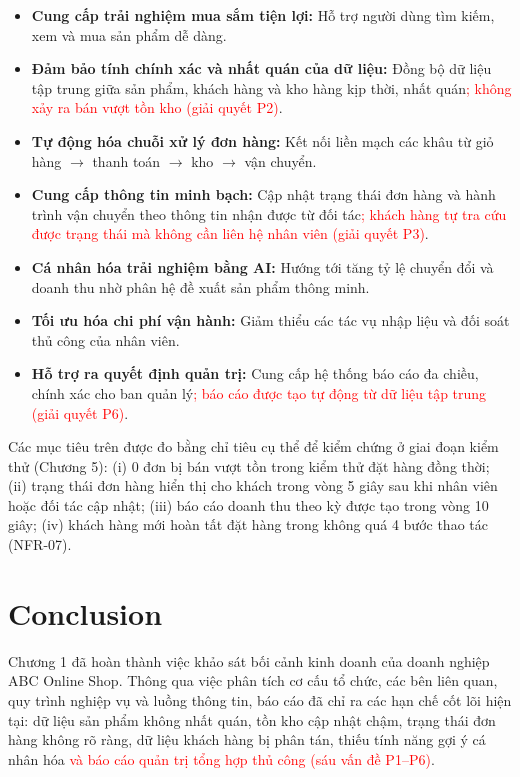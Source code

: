 \documentclass[12pt,a4paper,oneside]{report}
\newif\ifmark \marktrue
\newcommand{\chg}[1]{\ifmark\textcolor{red}{#1}\else #1\fi}
\newenvironment{chgblock}{\ifmark\color{red}\fi}{}
\begin{document}
\begin{itemize}
  \item \textbf{Cung cấp trải nghiệm mua sắm tiện lợi:} Hỗ trợ người dùng tìm kiếm, xem và mua sản phẩm dễ dàng.
  \item \textbf{Đảm bảo tính chính xác và nhất quán của dữ liệu:} Đồng bộ dữ liệu tập trung giữa sản phẩm, khách hàng và kho hàng kịp thời, nhất quán\chg{; không xảy ra bán vượt tồn kho (giải quyết P2)}.
  \item \textbf{Tự động hóa chuỗi xử lý đơn hàng:} Kết nối liền mạch các khâu từ giỏ hàng $\rightarrow$ thanh toán $\rightarrow$ kho $\rightarrow$ vận chuyển.
  \item \textbf{Cung cấp thông tin minh bạch:} Cập nhật trạng thái đơn hàng và hành trình vận chuyển theo thông tin nhận được từ đối tác\chg{; khách hàng tự tra cứu được trạng thái mà không cần liên hệ nhân viên (giải quyết P3)}.
  \item \textbf{Cá nhân hóa trải nghiệm bằng AI:} Hướng tới tăng tỷ lệ chuyển đổi và doanh thu nhờ phân hệ đề xuất sản phẩm thông minh.
  \item \textbf{Tối ưu hóa chi phí vận hành:} Giảm thiểu các tác vụ nhập liệu và đối soát thủ công của nhân viên.
  \item \textbf{Hỗ trợ ra quyết định quản trị:} Cung cấp hệ thống báo cáo đa chiều, chính xác cho ban quản lý\chg{; báo cáo được tạo tự động từ dữ liệu tập trung (giải quyết P6)}.
\end{itemize}

\begin{chgblock}
Các mục tiêu trên được đo bằng chỉ tiêu cụ thể để kiểm chứng ở giai đoạn kiểm thử (Chương 5): (i) 0 đơn bị bán vượt tồn trong kiểm thử đặt hàng đồng thời; (ii) trạng thái đơn hàng hiển thị cho khách trong vòng 5 giây sau khi nhân viên hoặc đối tác cập nhật; (iii) báo cáo doanh thu theo kỳ được tạo trong vòng 10 giây; (iv) khách hàng mới hoàn tất đặt hàng trong không quá 4 bước thao tác (NFR-07).
\end{chgblock}

\section{Conclusion}

Chương 1 đã hoàn thành việc khảo sát bối cảnh kinh doanh của doanh nghiệp ABC Online Shop. Thông qua việc phân tích cơ cấu tổ chức, các bên liên quan, quy trình nghiệp vụ và luồng thông tin, báo cáo đã chỉ ra các hạn chế cốt lõi hiện tại: dữ liệu sản phẩm không nhất quán, tồn kho cập nhật chậm, trạng thái đơn hàng không rõ ràng, dữ liệu khách hàng bị phân tán, thiếu tính năng gợi ý cá nhân hóa\chg{ và báo cáo quản trị tổng hợp thủ công (sáu vấn đề P1--P6)}.
\end{document}
